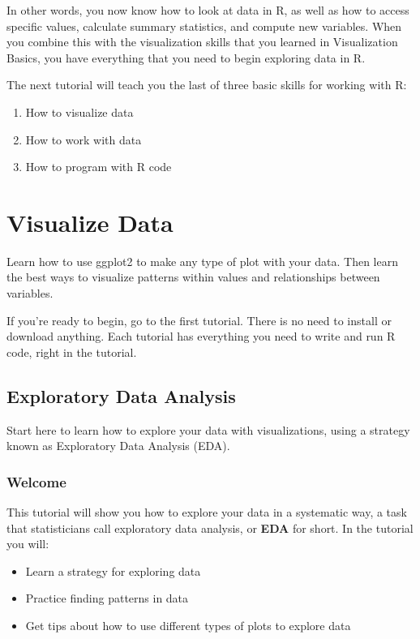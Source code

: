 \documentclass[
]{article}
\providecommand{\tightlist}{%
  \setlength{\itemsep}{0pt}\setlength{\parskip}{0pt}}
\begin{document}
In other words, you now know how to look at data in R, as well as how to
access specific values, calculate summary statistics, and compute new
variables. When you combine this with the visualization skills that you
learned in Visualization Basics, you have everything that you need to
begin exploring data in R.

The next tutorial will teach you the last of three basic skills for
working with R:

\begin{enumerate}
\def\labelenumi{\arabic{enumi}.}
\tightlist
\item
  How to visualize data
\item
  How to work with data
\item
  How to program with R code
\end{enumerate}

\hypertarget{visualize-data}{%
\section{Visualize Data}\label{visualize-data}}

Learn how to use ggplot2 to make any type of plot with your data. Then
learn the best ways to visualize patterns within values and
relationships between variables.

If you're ready to begin, go to the first tutorial. There is no need to
install or download anything. Each tutorial has everything you need to
write and run R code, right in the tutorial.

\hypertarget{exploratory-data-analysis}{%
\subsection{Exploratory Data Analysis}\label{exploratory-data-analysis}}

Start here to learn how to explore your data with visualizations, using
a strategy known as Exploratory Data Analysis (EDA).

\hypertarget{welcome-5}{%
\subsubsection{Welcome}\label{welcome-5}}

This tutorial will show you how to explore your data in a systematic
way, a task that statisticians call exploratory data analysis, or
\textbf{EDA} for short. In the tutorial you will:

\begin{itemize}
\tightlist
\item
  Learn a strategy for exploring data
\item
  Practice finding patterns in data
\item
  Get tips about how to use different types of plots to explore data
\end{itemize}
\end{document}

